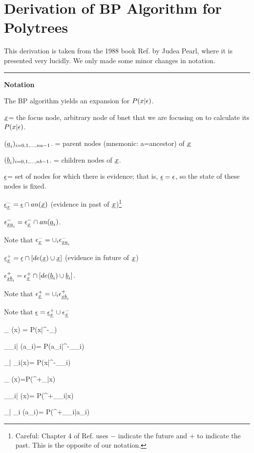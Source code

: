 \section{Derivation of BP Algorithm
for Polytrees}

This derivation is taken from
 the 1988 book Ref.\cite{pearl-1988book}
by Judea Pearl, where it
is presented very lucidly. We only
made some minor
changes in notation.

\hrule\noindent
 {\bf Notation}

The BP algorithm yields an expansion
 for $P(x|\epsilon)$.

$\rvx$= the focus node,
arbitrary node of bnet that we are
focusing on to calculate its $P(x|\epsilon)$.



$(\rva_i)_{i=0,1, \ldots, na-1}$. = parent nodes
 (mnemonic: a=ancestor) of $\rvx$

$(\rvb_i)_{i=0,1, \ldots, nb-1}$. =
children nodes of $\rvx$.

$\rveps$= set of nodes for which
 there is evidence; that is,
$\rveps=\eps$, so
the state of these nodes is fixed.


$\rveps^-_\rvx= \rveps\cap an(\rvx)$
(evidence in past of $\rvx$)\footnote{
Careful:
Chapter 4
of Ref.\cite{pearl-1988book}
uses $-$ indicate the future
and $+$ to indicate
 the past. This
is the opposite of our notation.}

$\eps^-_{\rvx \rva_i}=
\eps^-_{\rvx}\cap an(\rva_i)$.

Note that $\eps^-_\rvx=\cup_i
\eps^-_{\rvx \rva_i}$

$\rveps^+_\rvx= \rveps\cap [de(\rvx)\cup\rvx]$
(evidence in future of $\rvx$)

$\eps^+_{\rvx \rvb_i}=
\eps^+_{\rvx}\cap
 [de(\rvb_i)\cup \rvb_i]$.

Note that $\eps^+_\rvx=\cup_i
\eps^+_{\rvx \rvb_i}$

Note that $\rveps=\rveps^+_\rvx \cup \eps^-_\rvx$

\beq
\pi_{ \rvx}(x)
=
P(x|\eps^-_\rvx)
\eeq

\beq
\pi_{\rva_i| \rvx}(a_i)=
P(a_i|\eps^-_{\rvx \rva_i})
\eeq

\beq
\pi_{\rvx| \rvb_i}(x)=
P(x|\eps^-_{\rvx \rvb_i})
\eeq

\beq
\pi_{\rvx} (x)=P(\eps^+_\rvx|x)
\eeq

\beq
\pi_{\rvb_i| \rvx} (x)=
P(\eps^+_{\rvx \rvb_i}|x)
\eeq

\beq
\pi_{\rvx| \rva_i} (a_i)=
P(\eps^+_{\rvx \rva_i}|a_i)
\eeq



